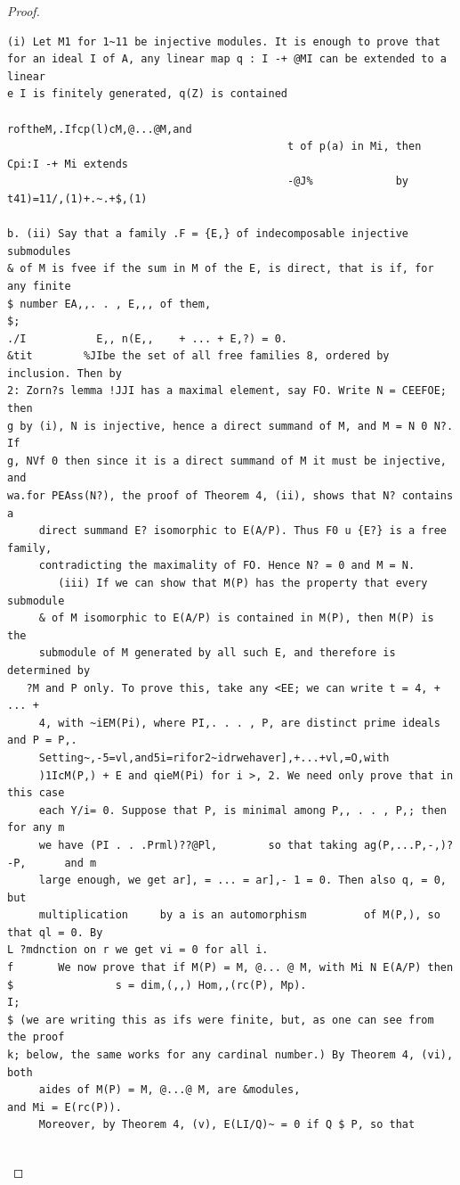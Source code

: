 \begin{proof}
\begin{verbatim}
(i) Let M1 for 1~11 be injective modules. It is enough to prove that
for an ideal I of A, any linear map q : I -+ @MI can be extended to a linear
e I is finitely generated, q(Z) is contained
                                             roftheM,.Ifcp(l)cM,@...@M,and
                                            t of p(a) in Mi, then Cpi:I -+ Mi extends
                                            -@J%             by t41)=11/,(1)+.~.+$,(1)

b. (ii) Say that a family .F = {E,} of indecomposable injective submodules
& of M is fvee if the sum in M of the E, is direct, that is if, for any finite
$ number EA,,. . , E,,, of them,
$;
./I           E,, n(E,,    + ... + E,?) = 0.
&tit        %JIbe the set of all free families 8, ordered by inclusion. Then by
2: Zorn?s lemma !JJI has a maximal element, say FO. Write N = CEEFOE; then
g by (i), N is injective, hence a direct summand of M, and M = N 0 N?. If
g, NVf 0 then since it is a direct summand of M it must be injective, and
wa.for PEAss(N?), the proof of Theorem 4, (ii), shows that N? contains a
     direct summand E? isomorphic to E(A/P). Thus F0 u {E?} is a free family,
     contradicting the maximality of FO. Hence N? = 0 and M = N.
        (iii) If we can show that M(P) has the property that every submodule
     & of M isomorphic to E(A/P) is contained in M(P), then M(P) is the
     submodule of M generated by all such E, and therefore is determined by
   ?M and P only. To prove this, take any <EE; we can write t = 4, + ... +
     4, with ~iEM(Pi), where PI,. . . , P, are distinct prime ideals and P = P,.
     Setting~,-5=vl,and5i=rifor2~idrwehaver],+...+vl,=O,with
     )1IcM(P,) + E and qieM(Pi) for i >, 2. We need only prove that in this case
     each Y/i= 0. Suppose that P, is minimal among P,, . . , P,; then for any m
     we have (PI . . .Prml)??@Pl,        so that taking ag(P,...P,-,)?-P,      and m
     large enough, we get ar], = ... = ar],- 1 = 0. Then also q, = 0, but
     multiplication     by a is an automorphism         of M(P,), so that ql = 0. By
L ?mdnction on r we get vi = 0 for all i.
f       We now prove that if M(P) = M, @... @ M, with Mi N E(A/P) then
$                s = dim,(,,) Hom,,(rc(P), Mp).
I;
$ (we are writing this as ifs were finite, but, as one can see from the proof
k; below, the same works for any cardinal number.) By Theorem 4, (vi), both
     aides of M(P) = M, @...@ M, are &modules,                       and Mi = E(rc(P)).
     Moreover, by Theorem 4, (v), E(LI/Q)~ = 0 if Q $ P, so that


\end{verbatim}
\end{proof}
